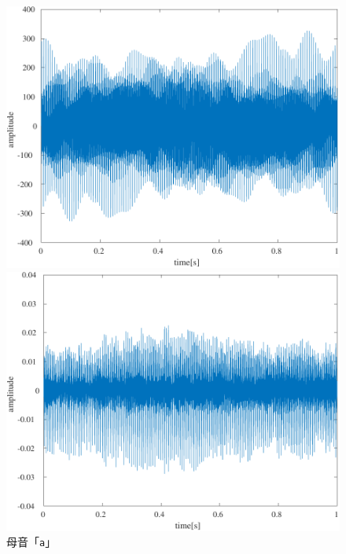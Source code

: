 \begin{figure}[H]
\begin{minipage}{.3\textwidth}
        \centering
        \includegraphics[keepaspectratio,width=\textwidth]{../../Figures/03_32_a.pdf}
    \end{minipage}
    \caption{母音「\texttt{a}」}
    \label{fig:合成音声_a}
    \begin{minipage}{.3\textwidth}
        \centering
        \includegraphics[keepaspectratio,width=\textwidth]{../../Figures/03_30_0i.pdf}
    \end{minipage}
    \begin{minipage}{.3\textwidth}
        \centering

\end{minipage}
\end{figure}
